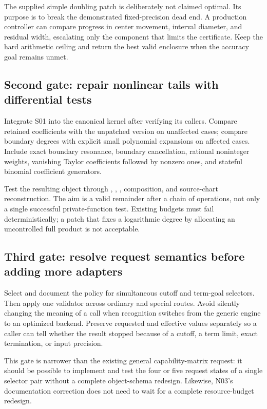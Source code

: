 \documentclass[11pt,a4paper]{article}
\newcommand{\code}[1]{\texttt{\detokenize{#1}}}
\begin{document}
The supplied simple doubling patch is deliberately not claimed optimal. Its purpose is to break the demonstrated fixed-precision dead end. A production controller can compare progress in center movement, interval diameter, and residual width, escalating only the component that limits the certificate. Keep the hard arithmetic ceiling and return the best valid enclosure when the accuracy goal remains unmet.

\subsection{Second gate: repair nonlinear tails with differential tests}
Integrate S01 into the canonical kernel after verifying its callers. Compare retained coefficients with the unpatched version on unaffected cases; compare boundary degrees with explicit small polynomial expansions on affected cases. Include exact boundary resonance, boundary cancellation, rational noninteger weights, vanishing Taylor coefficients followed by nonzero ones, and stateful binomial coefficient generators.

Test the resulting object through \code{SeriesLog}, \code{SeriesExp}, \code{SeriesObservable}, composition, and source-chart reconstruction. The aim is a valid remainder after a chain of operations, not only a single successful private-function test. Existing budgets must fail deterministically; a patch that fixes a logarithmic degree by allocating an uncontrolled full product is not acceptable.

\subsection{Third gate: resolve request semantics before adding more adapters}
Select and document the policy for simultaneous cutoff and term-goal selectors. Then apply one validator across ordinary and special routes. Avoid silently changing the meaning of a call when recognition switches from the generic engine to an optimized backend. Preserve requested and effective values separately so a caller can tell whether the result stopped because of a cutoff, a term limit, exact termination, or input precision.

This gate is narrower than the existing general capability-matrix request: it should be possible to implement and test the four or five request states of a single selector pair without a complete object-schema redesign. Likewise, N03's documentation correction does not need to wait for a complete resource-budget redesign.
\end{document}
